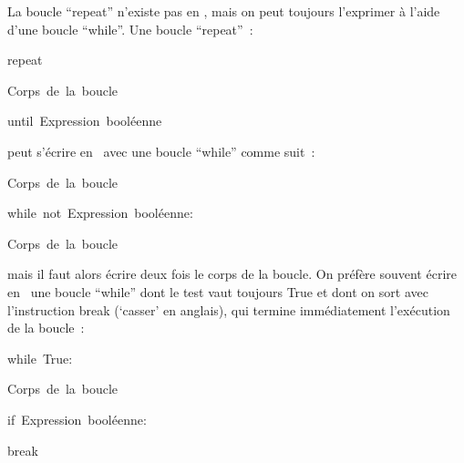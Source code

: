 {\begin{minipage}{\myparboxwidth}
\indent La boucle ``repeat'' n'existe pas en \python, mais on peut toujours l'exprimer
à l'aide d'une boucle ``while''. Une boucle ``repeat''~:
 {
\parindent {}
\medskip

\pagebreak[3]
\mbox{\blc  \blk\mcl repeat}\par
\mbox{\blc  \blk\blk\small\rm Corps de la boucle}\par
\mbox{\blc  \blk\mcl until {\small\rm Expression booléenne}}\par

\medskip }

\noindent peut s'écrire en \python\ avec une boucle ``while'' comme suit~:
{
\parindent {}
\medskip

\mbox{\blc  \blk\small\rm Corps de la boucle}\par
\mbox{\blc  \blk\mcl while\ not\ \small\rm Expression booléenne\idt :}\par
\mbox{\blc  \blk\blk\small\rm Corps de la boucle}\par

\medskip }

\noindent mais il faut alors écrire deux fois le corps de la boucle. On préfère
souvent écrire en \python\ une boucle ``while'' dont le test vaut toujours
{\mcl True} et dont on sort avec l'instruction {\mcl break}
(`casser' en anglais), qui termine immédiatement l'exécution de la boucle~:
{
\parindent {}
\medskip

\mbox{\blc  \blk\mcl while\ True\idt :}\par
\mbox{\blc  \blk\blk\small\rm Corps de la boucle}\par
\mbox{\blc  \blk\blk\mcl if\ \small\rm Expression booléenne\idt :}\par
\mbox{\blc  \blk\blk\blk\mcl break}\par

\medskip }

\vspace{\abovedisplayskip}
\end{minipage}
}
